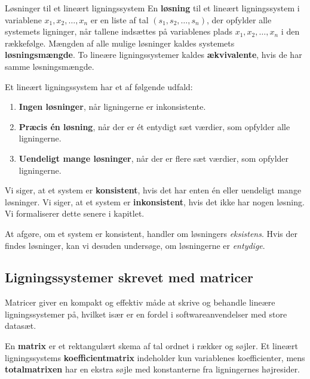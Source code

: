 \begin{definition}{Løsninger til et lineært ligningssystem} En \textbf{løsning} til et lineært ligningssystem i variablene $x_1, x_2, \ldots, x_n$ er en liste af tal $(s_1, s_2, \ldots, s_n)$, der opfylder alle systemets ligninger, når tallene indsættes på variablenes plads $x_1, x_2, \ldots, x_n$ i den rækkefølge. Mængden af alle mulige løsninger kaldes systemets \textbf{løsningsmængde}. To lineære ligningssystemer kaldes \textbf{ækvivalente}, hvis de har samme løsningsmængde. \end{definition}

Et lineært ligningssystem har et af følgende udfald:
\begin{enumerate}[label=(\roman*)]
    \item \textbf{Ingen løsninger}, når ligningerne er inkonsistente.
    \item \textbf{Præcis én løsning}, når der er ét entydigt sæt værdier, som opfylder alle ligningerne.
    \item \textbf{Uendeligt mange løsninger}, når der er flere sæt værdier, som opfylder ligningerne.
\end{enumerate}

Vi siger, at et system er \textbf{konsistent}, hvis det har enten én eller uendeligt mange løsninger. Vi siger, at et system
er \textbf{inkonsistent}, hvis det ikke har nogen løsning. Vi formaliserer dette senere i kapitlet.

\begin{remark} At afgøre, om et system er konsistent, handler om løsningers \emph{eksistens}. Hvis der findes løsninger, kan vi desuden undersøge, om løsningerne er \emph{entydige}. \end{remark}

\subsection*{Ligningssystemer skrevet med matricer}
Matricer giver en kompakt og effektiv måde at skrive og behandle lineære ligningssystemer på, hvilket især er en fordel i softwareanvendelser med store datasæt.

\begin{definition} En \textbf{matrix} er et rektangulært skema af tal ordnet i rækker og søjler. Et lineært ligningssystems \textbf{koefficientmatrix} indeholder kun variablenes koefficienter, mens \textbf{totalmatrixen} har en ekstra søjle med konstanterne fra ligningernes højresider. \end{definition}

